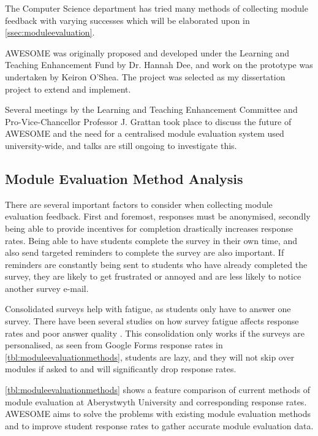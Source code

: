 	The Computer Science department has tried many methods of collecting module feedback with varying successes which will be elaborated upon in \autoref{ssec:moduleevaluation}.

	\ac{AWESOME} was originally proposed and developed under the Learning and Teaching Enhancement Fund by Dr. Hannah Dee, and work on the prototype was undertaken by Keiron O'Shea.
	The project was selected as my dissertation project to extend and implement.
	
	Several meetings by the Learning and Teaching Enhancement Committee and Pro-Vice-Chancellor Professor J. Grattan took place to discuss the future of \ac{AWESOME} and the need for a centralised module evaluation system used university-wide, and talks are still ongoing to investigate this.
	
	\subsection{Module Evaluation Method Analysis}
	\label{ssec:moduleevaluation}

	There are several important factors to consider when collecting module evaluation feedback.
	First and foremost, responses must be anonymised, secondly being able to provide incentives for completion drastically increases response rates.
	Being able to have students complete the survey in their own time, and also send targeted reminders to complete the survey are also important.
	If reminders are constantly being sent to students who have already completed the survey, they are likely to get frustrated or annoyed and are less likely to notice another survey e-mail.
	
	Consolidated surveys help with fatigue, as students only have to answer one survey.
	There have been several studies on how survey fatigue affects response rates and poor answer quality \cite{citeulike:13579648}.
	This consolidation only works if the surveys are personalised, as seen from Google Forms response rates in \autoref{tbl:moduleevaluationmethods}, students are lazy, and they will not skip over modules if asked to and will significantly drop response rates.
	
	\autoref{tbl:moduleevaluationmethods} shows a feature comparison of current methods of module evaluation at Aberystwyth University and corresponding response rates.
	\ac{AWESOME} aims to solve the problems with existing module evaluation methods and to improve student response rates to gather accurate module evaluation data.
	
